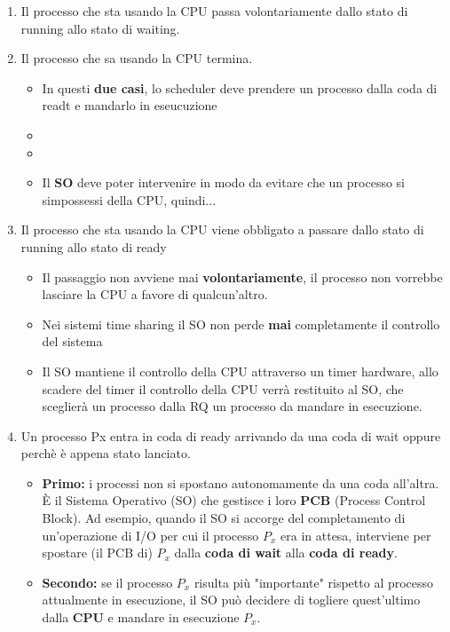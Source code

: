 \begin{enumerate}

    \item Il processo che sta usando la CPU passa volontariamente dallo stato di running allo stato di waiting.
    \item Il processo che sa usando la CPU termina.
    \begin{itemize}
        \item In questi \textbf{due casi}, lo scheduler deve prendere un processo dalla coda di readt e mandarlo in eseucuzione
        \item {}
        \item {}
        \item Il \textbf{SO} deve poter intervenire in modo da evitare che un processo si simpossessi della CPU, quindi...
    \end{itemize}
    \item Il processo che sta usando la CPU viene obbligato a passare dallo stato di running allo stato di ready
    \begin{itemize}
        \item Il passaggio non avviene mai \textbf{volontariamente}, il processo non vorrebbe lasciare la CPU a favore di qualcun'altro.
        \item Nei sistemi time sharing il SO non perde \textbf{mai} completamente il controllo del sistema
        \item Il SO mantiene il controllo della CPU attraverso un timer hardware, allo scadere del timer il controllo della CPU verrà restituito al SO, che sceglierà un processo dalla RQ un processo da mandare in esecuzione.
    \end{itemize}
    \item Un processo Px entra in coda di ready arrivando da una coda di wait oppure perchè è appena stato lanciato. 
    \begin{itemize}
    \item \textbf{Primo:} i processi non si spostano autonomamente da una coda all’altra. È il Sistema Operativo (SO) che gestisce i loro \textbf{PCB} (Process Control Block). Ad esempio, quando il SO si accorge del completamento di un'operazione di I/O per cui il processo $P_x$ era in attesa, interviene per spostare (il PCB di) $P_x$ dalla \textbf{coda di wait} alla \textbf{coda di ready}.
    
    \item \textbf{Secondo:} se il processo $P_x$ risulta più "importante" rispetto al processo attualmente in esecuzione, il SO può decidere di togliere quest’ultimo dalla \textbf{CPU} e mandare in esecuzione $P_x$.
\end{itemize}
\end{enumerate}

